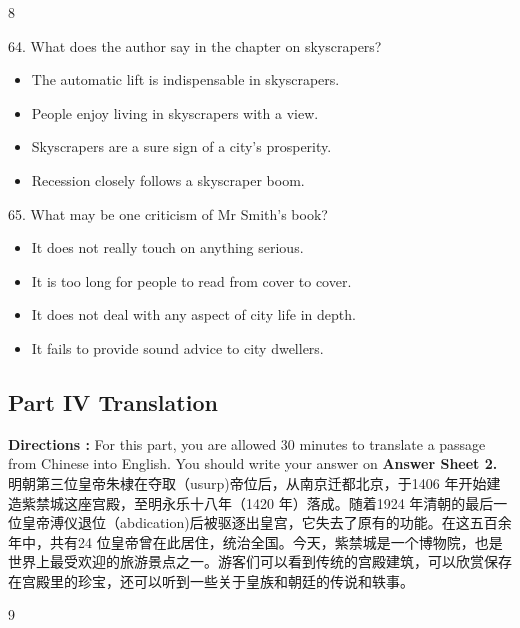 \documentclass[UTF8,11pt]{ctexart}
\begin{document}
8


64. What does the author say in the chapter on skyscrapers?


\begin{itemize}[leftmargin=2em,itemsep=.2em,topsep=.4em]\item[A.] The automatic lift is indispensable in skyscrapers.
\item[B.] People enjoy living in skyscrapers with a view.
\item[C.] Skyscrapers are a sure sign of a city’s prosperity.
\item[D.] Recession closely follows a skyscraper boom.
\end{itemize}

65. What may be one criticism of Mr Smith’s book?


\begin{itemize}[leftmargin=2em,itemsep=.2em,topsep=.4em]\item[A.] It does not really touch on anything serious.
\item[B.] It is too long for people to read from cover to cover.
\item[C.] It does not deal with any aspect of city life in depth.
\item[D.] It fails to provide sound advice to city dwellers.
\end{itemize}

\subsection*{\textbf{Part IV} \textbf{Translation}}


\textbf{Directions :} For this part, you are allowed 30 minutes to translate a passage from Chinese into English. You should write your answer on\textbf{ Answer Sheet 2.} 明朝第三位皇帝朱棣在夺取（usurp)帝位后，从南京迁都北京，于1406 年开始建造紫禁城这座宫殿，至明永乐十八年（1420 年）落成。随着1924 年清朝的最后一位皇帝溥仪退位（abdication)后被驱逐出皇宫，它失去了原有的功能。在这五百余年中，共有24 位皇帝曾在此居住，统治全国。今天，紫禁城是一个博物院，也是世界上最受欢迎的旅游景点之一。游客们可以看到传统的宫殿建筑，可以欣赏保存在宫殿里的珍宝，还可以听到一些关于皇族和朝廷的传说和轶事。


9
\end{document}
